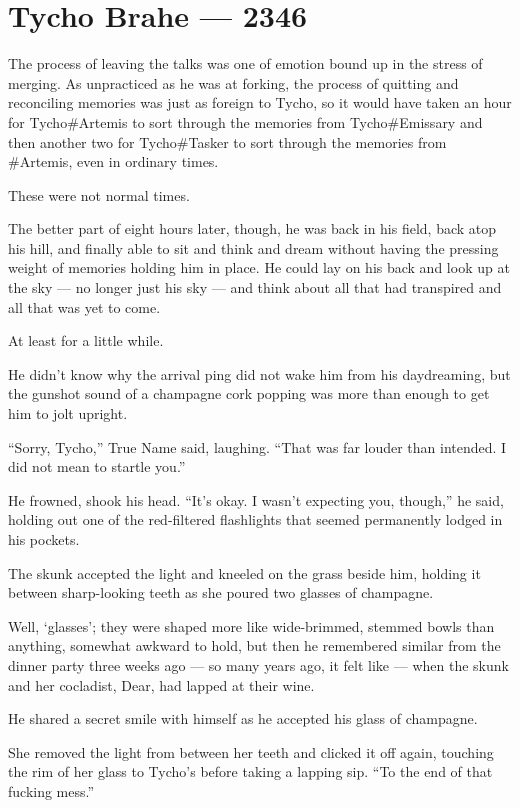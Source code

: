\hypertarget{tycho-brahe-2346}{%
\chapter{Tycho Brahe — 2346}\label{tycho-brahe-2346}}

The process of leaving the talks was one of emotion bound up in the stress of merging. As unpracticed as he was at forking, the process of quitting and reconciling memories was just as foreign to Tycho, so it would have taken an hour for Tycho\#Artemis to sort through the memories from Tycho\#Emissary and then another two for Tycho\#Tasker to sort through the memories from \#Artemis, even in ordinary times.

These were not normal times.

The better part of eight hours later, though, he was back in his field, back atop his hill, and finally able to sit and think and dream without having the pressing weight of memories holding him in place. He could lay on his back and look up at the sky — no longer just his sky — and think about all that had transpired and all that was yet to come.

At least for a little while.

He didn't know why the arrival ping did not wake him from his daydreaming, but the gunshot sound of a champagne cork popping was more than enough to get him to jolt upright.

``Sorry, Tycho,'' True Name said, laughing. ``That was far louder than intended. I did not mean to startle you.''

He frowned, shook his head. ``It's okay. I wasn't expecting you, though,'' he said, holding out one of the red-filtered flashlights that seemed permanently lodged in his pockets.

The skunk accepted the light and kneeled on the grass beside him, holding it between sharp-looking teeth as she poured two glasses of champagne.

Well, `glasses'; they were shaped more like wide-brimmed, stemmed bowls than anything, somewhat awkward to hold, but then he remembered similar from the dinner party three weeks ago — so many years ago, it felt like — when the skunk and her cocladist, Dear, had lapped at their wine.

He shared a secret smile with himself as he accepted his glass of champagne.

She removed the light from between her teeth and clicked it off again, touching the rim of her glass to Tycho's before taking a lapping sip. ``To the end of that fucking mess.''

